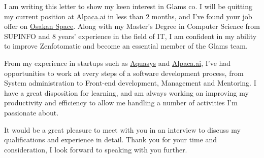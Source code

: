 \documentclass[10pt,stdletter,dateno,sigleft]{newlfm} %
\begin{document}
\begin{newlfm}


I am writing this letter to show my keen interest in Glams co. I will be
quitting my current position at \href{https://www.alpaca.ai/}{Alpaca.ai}
in less than 2 months, and I've found your job offer on
\href{http://www.osakan-space.com/blog/6690}{Osakan Space}.  Along with my
Master's Degree in Computer Science from SUPINFO and 8 years' experience in
the field of IT, I am confident in my ability to improve Zenfotomatic and become
an essential member of the Glams team.

From my experience in startups such as
\href{http://www.aquasys.co.jp/}{Aquasys} and
\href{https://www.alpaca.ai/}{Alpaca.ai}, I've had opportunities to work at
every steps of a software development process, from System administration to
Front-end development, Management and Mentoring. I have a great disposition for
learning, and am always working on improving my productivity and efficiency to
allow me handling a number of activities I'm passionate about. 

It would be a great pleasure to meet with you in an interview to discuss my
qualifications and experience in detail.  Thank you for your time and
consideration, I look forward to speaking with you further.


\end{newlfm}
\end{document}
